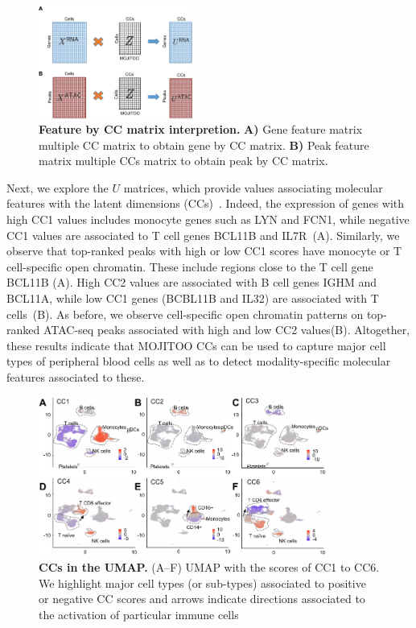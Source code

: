 \begin{figure}[!h]
	\centering
	\includegraphics[width=0.45\textwidth]{Zfeature/fig}
	\vspace{0.1cm}
	\caption[Feature by CC matrix interpretion.]{\textbf{Feature by CC matrix interpretion.} \textbf{A)} Gene feature matrix multiple CC matrix to obtain gene by CC matrix. \textbf{B)} Peak feature matrix multiple CCs matrix to obtain peak by CC matrix.}
	\label{fig:Zfeature}
\end{figure}

Next, we explore the $U$ matrices, which provide values associating molecular features with the latent dimensions (CCs)~. Indeed, the expression of genes with high CC1 values includes monocyte genes such as LYN and FCN1, while negative CC1 values are associated to T cell genes BCL11B and IL7R~(A). Similarly, we observe that top-ranked peaks with high or low CC1 scores have monocyte or T cell-specific open chromatin. These include regions close to the T cell gene BCL11B (A). High CC2 values are associated with B cell genes IGHM and BCL11A, while low CC1 genes (BCBL11B and IL32) are associated with T cells~(B). As before, we observe cell-specific open chromatin patterns on top-ranked ATAC-seq peaks associated with high and low CC2 values(B). Altogether, these results indicate that MOJITOO CCs can be used to capture major cell types of peripheral blood cells as well as to detect modality-specific molecular features associated to these.


\begin{figure}[!h]
	\centering
	\includegraphics[width=0.85\textwidth]{CC_UMAP/fig}
	\vspace{0.1cm}
	\caption[CCs in the UMAP.]{\textbf{CCs in the UMAP.} (A–F) UMAP with the scores of CC1 to CC6. We highlight major cell types (or sub-types) associated to positive or negative CC scores and arrows indicate directions associated to the activation of particular immune cells}
	\label{fig:CC_UMAP}
\end{figure}


